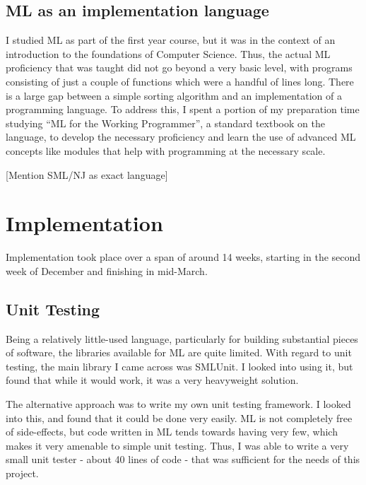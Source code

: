 \documentclass[12pt]{article}
\begin{document}

\subsection{ML as an implementation language}

I studied ML as part of the first year course, but it was in the context of an introduction to the foundations of Computer Science. 
Thus, the actual ML proficiency that was taught did not go beyond a very basic level, with programs consisting of just a couple of functions which were a handful of lines long. 
There is a large gap between a simple sorting algorithm and an implementation of a programming language. 
To address this, I spent a portion of my preparation time studying ``ML for the Working Programmer'', a standard textbook on the language, to develop the necessary proficiency and learn the use of advanced ML concepts like modules that help with programming at the necessary scale.

[Mention SML/NJ as exact language]

\newpage

\section{Implementation}



Implementation took place over a span of around 14 weeks, starting in the second week of December and finishing in mid-March. 

\subsection{Unit Testing}

Being a relatively little-used language, particularly for building substantial pieces of software, the libraries available for ML are quite limited. 
With regard to unit testing, the main library I came across was SMLUnit. 
I looked into using it, but found that while it would work, it was a very heavyweight solution.

The alternative approach was to write my own unit testing framework. 
I looked into this, and found that it could be done very easily. 
ML is not completely free of side-effects, but code written in ML tends towards having very few, which makes it very amenable to simple unit testing. 
Thus, I was able to write a very small unit tester - about 40 lines of code - that was sufficient for the needs of this project.
\end{document}
